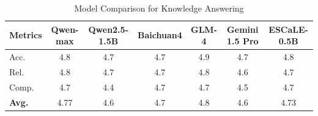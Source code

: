 \documentclass[preprint,12pt]{elsarticle}
\begin{document}
\begin{table}[!t]
\centering
\caption{\label{tab:tableK} Model Comparison for Knowledge Answering}
\setlength{\tabcolsep}{2.5pt} %
\renewcommand{\arraystretch}{0.8} %
\footnotesize
\begin{tabular}{l*{6}{c}}
\toprule
Metrics & Qwen-max & Qwen2.5-1.5B & Baichuan4 & GLM-4 & Gemini 1.5 Pro & ESCaLE-0.5B \\
\midrule
Acc. & 4.8 & 4.7 & 4.7 & 4.9 & 4.7 & 4.8 \\
Rel. & 4.8 & 4.7 & 4.7 & 4.8 & 4.6 & 4.7 \\
Comp. & 4.7 & 4.4 & 4.7 & 4.7 & 4.5 & 4.7 \\
\textbf{Avg.} & 4.77 & 4.6 & 4.7 & 4.8 & 4.6 & 4.73 \\
\bottomrule
\end{tabular}
\end{table}
\end{document}

